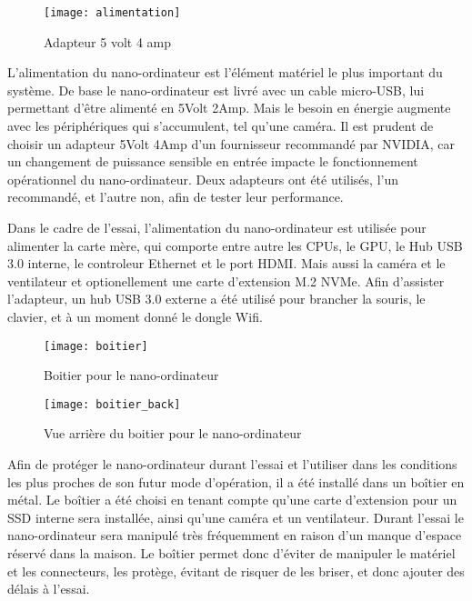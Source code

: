 \begin{figure}[H]
    \centering
    \texttt{[image: alimentation]}
    \caption{Adapteur 5 volt 4 amp}
    \label{fig:alimenation}
\end{figure}
\par L'alimentation du nano-ordinateur est l'élément matériel le plus important du système. De base le nano-ordinateur est livré avec un cable micro-USB, lui permettant d'être alimenté en 5Volt 2Amp. Mais le besoin en énergie augmente avec les périphériques qui s'accumulent, tel qu'une caméra. Il est prudent de choisir un adapteur 5Volt 4Amp d'un fournisseur recommandé par NVIDIA, car un changement de puissance sensible en entrée impacte le fonctionnement opérationnel du nano-ordinateur. Deux adapteurs ont été utilisés, l'un recommandé, et l'autre non, afin de tester leur performance. 
\par Dans le cadre de l'essai, l'alimentation du nano-ordinateur est utilisée pour alimenter la carte mère, qui comporte entre autre les CPUs, le GPU, le Hub USB 3.0 interne, le controleur Ethernet et le port HDMI. Mais aussi la caméra et  le ventilateur et optionellement une carte d'extension M.2 NVMe. Afin d'assister l'adapteur, un hub USB 3.0 externe a été utilisé pour brancher la souris, le clavier, et à un moment donné le dongle Wifi.
\begin{figure}[H]
    \centering
    \texttt{[image: boitier]}
    \caption{Boitier pour le nano-ordinateur}
    \label{fig:boitier}
\end{figure}
\begin{figure}[H]
    \centering
    \texttt{[image: boitier\_back]}
    \caption{Vue arrière du boitier pour le nano-ordinateur}
    \label{fig:boitier_arriere}
\end{figure}
\par Afin de protéger le nano-ordinateur durant l'essai et l'utiliser dans les conditions les plus proches de son futur mode d'opération, il a été installé dans un boîtier en métal. Le boîtier a été choisi en tenant compte qu'une carte d'extension pour un SSD interne sera installée, ainsi qu'une caméra et un ventilateur. Durant l'essai le nano-ordinateur sera manipulé très fréquemment en raison d'un manque d'espace réservé dans la maison. Le boîtier permet donc d'éviter de manipuler le matériel et les connecteurs, les protège, évitant de risquer de les briser, et donc ajouter des délais à l'essai. 
